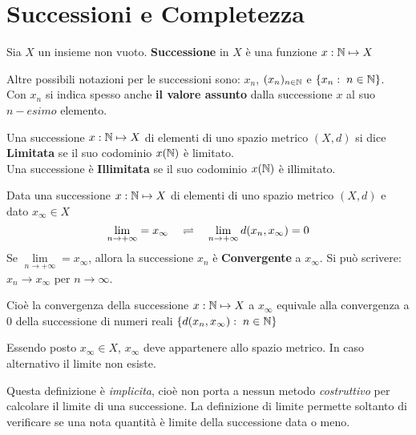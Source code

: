 \section{Successioni e Completezza}
\begin{definition}[Successione]
	Sia $X$ un insieme non vuoto. \textbf{Successione} in $X$ è una funzione $x: \mathbb{N} \mapsto X$
	\begin{note}
		Altre possibili notazioni per le successioni sono: $x_n$, $(x_n)_{n \in \mathbb{N}}$ e $\left\{x_n:\; n \in \mathbb{N}\right\}$.\\
		Con $x_n$ si indica spesso anche \textbf{il valore assunto} dalla successione $x$ al suo $n-esimo$ elemento.
	\end{note}
\end{definition}
\begin{definition}
	Una successione $x: \mathbb{N} \mapsto X$ di elementi di uno spazio metrico $(X,d)$ si dice \textbf{Limitata} se il suo codominio $x(\mathbb{N})$ è limitato.\\
	Una successione è \textbf{Illimitata} se il suo codominio $x(\mathbb{N})$ è illimitato.
\end{definition}
\begin{definition}[Limite per Successioni] %
	\label{def:lim_succ}
	Data una successione $x: \mathbb{N} \mapsto X$ di elementi di uno spazio metrico $(X,d)$ e dato $x_\infty \in X$
	\[\lim\limits_{n \to +\infty} = x_\infty \quad \rightleftharpoons \quad \lim\limits_{n \to +\infty} d(x_n,x_\infty) = 0\]
	Se $\lim\limits_{n \to +\infty} = x_\infty$, allora la successione $x_n$ è \textbf{Convergente} a $x_\infty$. Si può scrivere: $x_n \to x_\infty$ per $n \to \infty$.

	Cioè la convergenza della successione $x: \mathbb{N} \mapsto X$ a $x_\infty$ equivale alla convergenza a $0$ della successione di numeri reali $\left\{d(x_n,x_\infty):\; n \in \mathbb{N}\right\}$
	\begin{note}
		Essendo posto $x_\infty \in X$, $x_\infty$ deve appartenere allo spazio metrico. In caso alternativo il limite non esiste.
	\end{note}
	\begin{note}
		Questa definizione è \textit{implicita}, cioè non porta a nessun metodo \textit{costruttivo} per calcolare il limite di una successione. La definizione di limite permette soltanto di verificare se una nota quantità è limite della successione data o meno.
	\end{note}
\end{definition}
